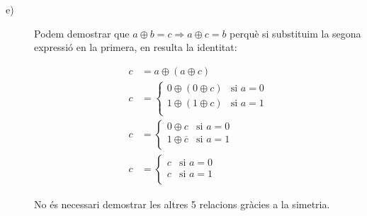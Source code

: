 \documentclass[catalan,border=15pt,class=scrartcl,multi=minipage]{standalone}
\begin{document}
\begin{minipage}{30em}
\begin{description}
\item [{e)}] Podem demostrar que $a \oplus b = c \Rightarrow a \oplus c = b$ perquè si substituim la segona expressió en la primera, en resulta la identitat:

\begin{align*}
  c &= a \oplus \left(a \oplus c\right) \\
  c &= \begin{cases}
    0 \oplus \left(0 \oplus c\right) & \text{si $a = 0$} \\
    1 \oplus \left(1 \oplus c\right) & \text{si $a = 1$} \\
  \end{cases} \\
  c &= \begin{cases}
    0 \oplus c & \text{si $a = 0$} \\
    1 \oplus \overline{c} & \text{si $a = 1$} \\
  \end{cases} \\
  c &= \begin{cases}
    c & \text{si $a = 0$} \\
    c & \text{si $a = 1$} \\
  \end{cases}
\end{align*}

No és necessari demostrar les altres 5 relacions gràcies a la simetria.
\end{description}

\end{minipage}
\end{document}
